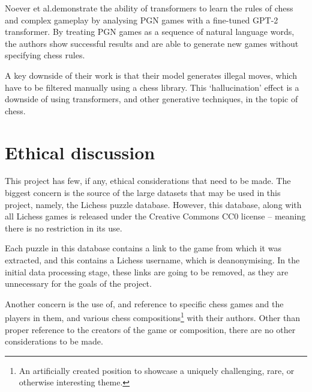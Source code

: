 Noever et al.\@ demonstrate the ability of transformers to learn the rules of
chess and complex gameplay by analysing PGN games with a fine-tuned GPT-2
transformer.\cite{chessTransformer} By treating PGN games as a sequence of
natural language words, the authors show successful results and are able to
generate new games without specifying chess rules.

A key downside of their work is that their model generates illegal moves, which
have to be filtered manually using a chess library.\cite{chessTransformer} This
`hallucination' effect is a downside of using transformers, and other
generative techniques, in the topic of chess. 

\section{Ethical discussion}

This project has few, if any, ethical considerations that need to be made. The
biggest concern is the source of the large datasets that may be used in this
project, namely, the Lichess puzzle database.\cite{lichessPuzzles} However,
this database, along with all Lichess games is released under the Creative
Commons CC0 license -- meaning there is no restriction in its use.

Each puzzle in this database contains a link to the game from which it was
extracted, and this contains a Lichess username, which is deanonymising. In the
initial data processing stage, these links are going to be removed, as they are
unnecessary for the goals of the project.

Another concern is the use of, and reference to specific chess games and the
players in them, and various chess compositions\footnote{An artificially
created position to showcase a uniquely challenging, rare, or otherwise
interesting theme.} with their authors. Other than proper reference to the
creators of the game or composition, there are no other considerations to be
made.

